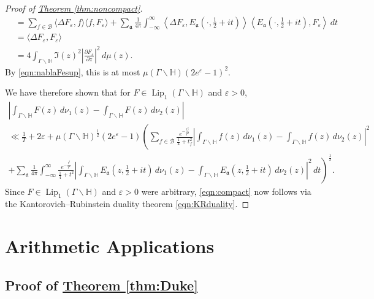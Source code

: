 \documentclass[11pt,a4paper]{amsart}
\newcommand{\af}{\mathfrak{a}}
\newcommand{\BB}{\mathcal{B}}
\newcommand{\dee}{\partial}
\newcommand{\e}{\varepsilon}
\newcommand{\Hb}{\mathbb{H}}
\DeclareMathOperator{\Lip}{Lip}
\numberwithin{equation}{section}
\theoremstyle{remark}
\theoremstyle{definition}
\begin{document}
\begin{proof}[Proof of {\hyperref[thm:noncompact]{Theorem \ref*{thm:noncompact}}}]
\begin{align*}
& = \sum_{f \in \BB} \langle \Delta F_{\e},f\rangle \langle f,F_{\e}\rangle + \sum_{\af} \frac{1}{4\pi} \int_{-\infty}^{\infty} \left\langle \Delta F_{\e}, E_{\af}\left(\cdot, \frac{1}{2} + it\right)\right\rangle \left\langle E_{\af}\left(\cdot, \frac{1}{2} + it\right), F_{\e}\right\rangle \, dt	\\
& = \langle \Delta F_{\e},F_{\e}\rangle	\\
& = 4 \int_{\Gamma \backslash \Hb} \Im(z)^2 \left|\frac{\dee F_{\e}}{\dee z}\right|^2 \, d\mu(z).
\end{align*}
By \eqref{eqn:nablaFesup}, this is at most $\mu(\Gamma \backslash \Hb) (2e^{\e} - 1)^2$.

We have therefore shown that for $F \in \Lip_1(\Gamma \backslash \Hb)$ and $\e > 0$,
\begin{multline*}
\left|\int_{\Gamma \backslash \Hb} F(z) \, d\nu_1(z) - \int_{\Gamma \backslash \Hb} F(z) \, d\nu_2(z)\right|	\\
\ll \frac{1}{T} + 2\e + \mu(\Gamma \backslash \Hb)^{\frac{1}{2}} (2e^{\e} - 1) \left(\sum_{f \in \BB} \frac{e^{-\frac{t_f^2}{T^2}}}{\frac{1}{4} + t_f^2} \left|\int_{\Gamma \backslash \Hb} f(z) \, d\nu_1(z) - \int_{\Gamma \backslash \Hb} f(z) \, d\nu_2(z)\right|^2 \right.	\\
\left. + \sum_{\af} \frac{1}{4\pi} \int_{-\infty}^{\infty} \frac{e^{-\frac{t^2}{T^2}}}{\frac{1}{4} + t^2} \left|\int_{\Gamma \backslash \Hb} E_{\af}\left(z,\frac{1}{2} + it\right) \, d\nu_1(z) - \int_{\Gamma \backslash \Hb} E_{\af}\left(z,\frac{1}{2} + it\right) \, d\nu_2(z)\right|^2 \, dt\right)^{\frac{1}{2}}.
\end{multline*}
Since $F \in \Lip_1(\Gamma \backslash \Hb)$ and $\e > 0$ were arbitrary, \eqref{eqn:compact} now follows via the Kantorovich--Rubinstein duality theorem \eqref{eqn:KRduality}.
\end{proof}


\section{Arithmetic Applications}


\subsection{Proof of \texorpdfstring{\hyperref[thm:Duke]{Theorem \ref*{thm:Duke}}}{Theorem \ref{thm:Duke}}}
\end{document}
